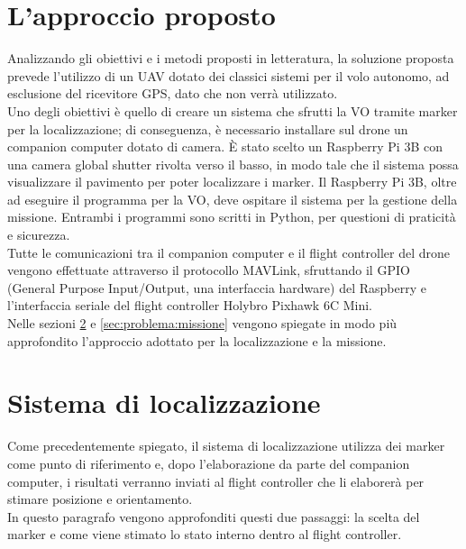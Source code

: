 \section{L’approccio proposto}
Analizzando gli obiettivi e i metodi proposti in letteratura, la soluzione proposta prevede l'utilizzo di un UAV dotato dei classici sistemi per il volo autonomo, ad esclusione del ricevitore GPS, dato che non verrà utilizzato.  \\
Uno degli obiettivi è quello di creare un sistema che sfrutti la VO tramite marker per la localizzazione; di conseguenza, è necessario installare sul drone un companion computer dotato di camera. È stato scelto un Raspberry Pi 3B con una camera global shutter rivolta verso il basso, in modo tale che il sistema possa visualizzare il pavimento per poter localizzare i marker. Il Raspberry Pi 3B, oltre ad eseguire il programma per la VO, deve ospitare il sistema per la gestione della missione. Entrambi i programmi sono scritti in Python, per questioni di praticità e sicurezza.\\
Tutte le comunicazioni tra il companion computer e il flight controller del drone vengono effettuate attraverso il protocollo MAVLink, sfruttando il GPIO (General Purpose Input/Output, una interfaccia hardware) del Raspberry e l'interfaccia seriale del flight controller Holybro Pixhawk 6C Mini. \\
Nelle sezioni \ref{sec:problema:localizzazione} e \ref{sec:problema:missione} vengono spiegate in modo più approfondito l'approccio adottato per la localizzazione e la missione.

\section{Sistema di localizzazione}
\label{sec:problema:localizzazione}
Come precedentemente spiegato, il sistema di localizzazione utilizza dei marker come punto di riferimento e, dopo l'elaborazione da parte del companion computer, i risultati verranno inviati al flight controller che li elaborerà per stimare posizione e orientamento. \\
In questo paragrafo vengono approfonditi questi due passaggi: la scelta del marker e come viene stimato lo stato interno dentro al flight controller.
